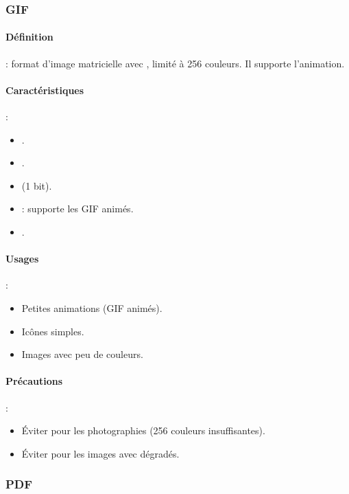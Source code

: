 \subsubsection{GIF}

\paragraph{Définition} : format d'image matricielle avec , limité à 256 couleurs. Il supporte l'animation.

\paragraph{Caractéristiques} :
\begin{itemize}
    \item {}.
    \item {}.
    \item {} (1 bit).
    \item {} : supporte les GIF animés.
    \item {}.
\end{itemize}

\paragraph{Usages} :
\begin{itemize}
    \item Petites animations (GIF animés).
    \item Icônes simples.
    \item Images avec peu de couleurs.
\end{itemize}

\paragraph{Précautions} :
\begin{itemize}
    \item Éviter pour les photographies (256 couleurs insuffisantes).
    \item Éviter pour les images avec dégradés.
\end{itemize}

\subsubsection{PDF}

